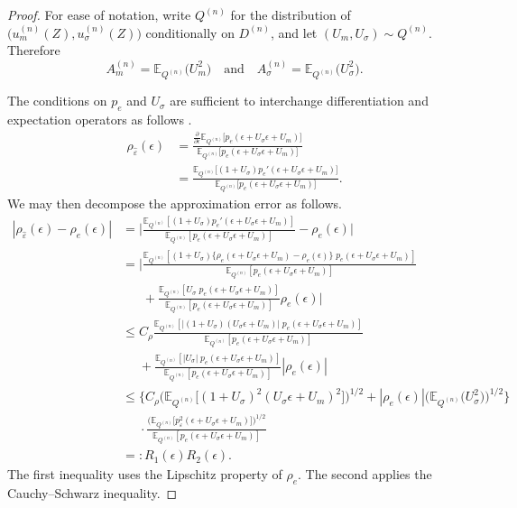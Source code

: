\documentclass[aos]{imsart}
\newcommand{\E}{\mathbb{E}}
\begin{document}
	\begin{proof}
		For ease of notation, write $Q^{(n)}$ for the distribution of $\big(u_m^{(n)}(Z), u_\sigma^{(n)}(Z)\big)$ conditionally on $D^{(n)}$, and let $(U_m, U_\sigma)\sim Q^{(n)}$.
		Therefore
		\begin{equation*}
			A_m^{(n)} = \E_{Q^{(n)}} \big(U_m^2\big) \quad \text{and} \quad A_\sigma^{(n)} = \E_{Q^{(n)}} \big(U_\sigma^2\big).
		\end{equation*}
		
		
		The conditions on $p_{e}$ and $U_\sigma$ are sufficient to interchange differentiation and expectation operators as follows \citep[Thm.~20.4]{AliprantisAnalysis}. 
		\begin{align*}
			\rho_{\hat\varepsilon}(\epsilon)  &= \frac{\frac{\partial}{\partial \epsilon}\E_{Q^{(n)}}\big[p_{e}(\epsilon + U_\sigma\epsilon + U_m) \big]}{\E_{Q^{(n)}}\big[p_{e}(\epsilon + U_\sigma\epsilon + U_m) \big]}\\
			&=  \frac{\E_{Q^{(n)}}\big[(1+U_\sigma)p_{e}'(\epsilon + U_\sigma\epsilon + U_m) \big]}{\E_{Q^{(n)}}\big[p_{e}(\epsilon + U_\sigma\epsilon + U_m) \big]}.
		\end{align*}
		We may then decompose the approximation error as follows.
		\begin{align*}
			|\rho_{\hat\varepsilon}(\epsilon) - \rho_{e}(\epsilon)| &= \bigg|\frac{\E_{Q^{(n)}} [(1+U_\sigma)p_{e}'(\epsilon + U_\sigma\epsilon + U_m)] }{\E_{Q^{(n)}} [p_{e}(\epsilon + U_\sigma\epsilon + U_m)]} - \rho_{e}(\epsilon) \bigg| \\
			&=\bigg|\frac{\E_{Q^{(n)}} [(1+U_\sigma)\{\rho_{e}(\epsilon + U_\sigma\epsilon + U_m) - \rho_{e}(\epsilon) \}\;p_{e}(\epsilon + U_\sigma\epsilon + U_m)] }{\E_{Q^{(n)}} [p_{e}(\epsilon + U_\sigma\epsilon + U_m)]} \\
			&\phantom{=\bigg|} + \frac{\E_{Q^{(n)}} [U_\sigma\;p_{e}(\epsilon + U_\sigma\epsilon + U_m)] }{\E_{Q^{(n)}} [p_{e}(\epsilon + U_\sigma\epsilon + U_m)]} \rho_{e}(\epsilon)\bigg| \\
			&\leq C_\rho \frac{\E_{Q^{(n)}} [|(1+U_\sigma)( U_\sigma\epsilon + U_m)| \;p_{e}(\epsilon + U_\sigma\epsilon + U_m)] }{\E_{Q^{(n)}} [p_{e}(\epsilon + U_\sigma\epsilon + U_m)]} \\
			&\phantom{\leq} + \frac{\E_{Q^{(n)}} [|U_\sigma|\;p_{e}(\epsilon + U_\sigma\epsilon + U_m)] }{\E_{Q^{(n)}} [p_{e}(\epsilon + U_\sigma\epsilon + U_m)]} |\rho_{e}(\epsilon)| \\
			&\leq \bigg\{C_\rho \Big(\E_{Q^{(n)}} \big[(1+U_\sigma)^2( U_\sigma\epsilon + U_m)^2\big]\Big)^{1/2} + |\rho_{e}(\epsilon)|\Big( \E_{Q^{(n)}}\big(U_\sigma^2\big)\Big)^{1/2} \bigg\} \\
			&\phantom{\leq} \cdot \frac{\Big(\E_{Q^{(n)}} \big[p^2_\varepsilon(\epsilon + U_\sigma\epsilon + U_m)\big]\Big)^{1/2} }{\E_{Q^{(n)}} [p_{e}(\epsilon + U_\sigma\epsilon + U_m)]}\\
			&=: R_1(\epsilon) R_2(\epsilon).
		\end{align*}
		The first inequality uses the Lipschitz property of $\rho_{e}$. The second applies the Cauchy--Schwarz inequality.
		

\end{proof}
\end{document}
